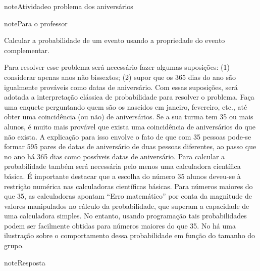 \begin{sphinxadmonition}{note}{Atividade}{o problema dos aniversários}
\label{ativ-problema-dos-aniverarios}

\begin{sphinxadmonition}{note}{Para o professor}

  Calcular a probabilidade de um evento usando a  propriedade do evento complementar.

  Para resolver esse problema será necessário fazer algumas suposições: (1) considerar apenas anos não bissextos; (2) supor que os 365 dias do ano são igualmente prováveis como datas de aniversário. Com essas suposições, será adotada a interpretação clássica de probabilidade para resolver o problema. Faça uma enquete perguntando quem são os nascidos em janeiro, fevereiro, etc., até obter uma coincidência (ou não) de aniversários. Se a sua turma tem 35 ou mais alunos, é muito mais provável que exista uma coincidência de aniversários do que não exista. A explicação para isso envolve o fato de que com 35 pessoas pode-se formar 595 pares de datas de aniversário de duas pessoas diferentes, ao passo que no ano há 365 dias como possíveis datas de aniversário. Para calcular a probabilidade também será necessária pelo menos uma calculadora científica básica. É importante destacar que a escolha do número 35 alunos deveu-se à restrição numérica nas calculadoras científicas básicas. Para números maiores do que 35, as calculadoras apontam “Erro matemático” por conta da magnitude de valores manipulados no cálculo da probabilidade, que superam a capacidade de uma calculadora simples. No entanto, usando programação tais probabilidades podem ser facilmente obtidas para números maiores do que 35. No
 há uma ilustração sobre o comportamento dessa probabilidade em função do tamanho do grupo.

\begin{sphinxadmonition}{note}{Resposta}


\end{sphinxadmonition}
\end{sphinxadmonition}
\end{sphinxadmonition}
